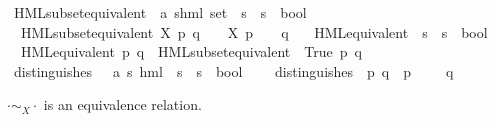 \begin{isabellebody}
\begin{isamarkuptext}
\end{isamarkuptext}\isamarkuptrue%
\isamarkupfalse%
\ HML{\isacharunderscore}{\kern0pt}subset{\isacharunderscore}{\kern0pt}equivalent\ {\isacharcolon}{\kern0pt}{\isacharcolon}{\kern0pt}\ {\isacartoucheopen}{\isacharparenleft}{\kern0pt}{\isacharprime}{\kern0pt}a{\isacharcomma}{\kern0pt}\ {\isacharprime}{\kern0pt}s{\isacharparenright}{\kern0pt}hml\ set\ {\isasymRightarrow}\ {\isacharprime}{\kern0pt}s\ {\isasymRightarrow}\ {\isacharprime}{\kern0pt}s\ {\isasymRightarrow}\ bool{\isacartoucheclose}\ \isanewline
\ \ {\isacartoucheopen}HML{\isacharunderscore}{\kern0pt}subset{\isacharunderscore}{\kern0pt}equivalent\ X\ p\ q\ {\isasymequiv}\ {\isacharparenleft}{\kern0pt}{\isasymforall}{\isasymphi}\ {\isasymin}\ X{\isachardot}{\kern0pt}\ {\isacharparenleft}{\kern0pt}p\ {\isasymTurnstile}\ {\isasymphi}{\isacharparenright}{\kern0pt}\ {\isasymlongleftrightarrow}\ {\isacharparenleft}{\kern0pt}q\ {\isasymTurnstile}\ {\isasymphi}{\isacharparenright}{\kern0pt}{\isacharparenright}{\kern0pt}{\isacartoucheclose}\isanewline
\isanewline
{}\isamarkupfalse%
\ HML{\isacharunderscore}{\kern0pt}equivalent\ {\isacharcolon}{\kern0pt}{\isacharcolon}{\kern0pt}\ {\isachardoublequoteopen}{\isacharprime}{\kern0pt}s\ {\isasymRightarrow}\ {\isacharprime}{\kern0pt}s\ {\isasymRightarrow}\ bool{\isachardoublequoteclose}\ \isanewline
\ \ {\isachardoublequoteopen}HML{\isacharunderscore}{\kern0pt}equivalent\ p\ q\ {\isasymequiv}\ HML{\isacharunderscore}{\kern0pt}subset{\isacharunderscore}{\kern0pt}equivalent\ {\isacharbraceleft}{\kern0pt}{\isasymphi}{\isachardot}{\kern0pt}\ True{\isacharbraceright}{\kern0pt}\ p\ q{\isachardoublequoteclose}\isanewline
\isanewline
{}\isamarkupfalse%
\ distinguishes\ {\isacharcolon}{\kern0pt}{\isacharcolon}{\kern0pt}\ \ {\isacartoucheopen}{\isacharparenleft}{\kern0pt}{\isacharprime}{\kern0pt}a{\isacharcomma}{\kern0pt}\ {\isacharprime}{\kern0pt}s{\isacharparenright}{\kern0pt}\ hml\ {\isasymRightarrow}\ {\isacharprime}{\kern0pt}s\ {\isasymRightarrow}\ {\isacharprime}{\kern0pt}s\ {\isasymRightarrow}\ bool{\isacartoucheclose}\ \isanewline
\ \ \ {\isacartoucheopen}distinguishes\ {\isasymphi}\ p\ q\ {\isasymequiv}\ p\ {\isasymTurnstile}\ {\isasymphi}\ {\isasymand}\ {\isasymnot}\ q\ {\isasymTurnstile}\ {\isasymphi}{\isacartoucheclose}%
\begin{isamarkuptext}%
$\cdot \sim_X \cdot$ is an equivalence relation.%
\end{isamarkuptext}\isamarkuptrue%

\end{isabellebody}
